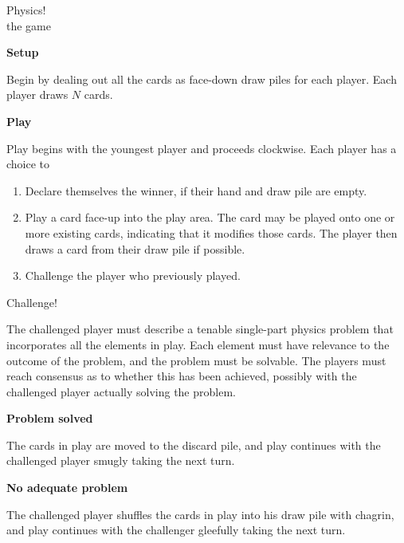 \documentclass[11pt]{article}
\newcommand\myssection[1]{\begin{center}\bf\small\noindent #1\end{center}}
\newcommand\myheader[1]{\begin{center}\small\sc #1\end{center}}
\begin{document}
\myheader{\Large\sc Physics! \footnotesize \\  the game}

\tiny

\myssection{Setup} Begin by dealing out all the cards as face-down
draw piles for each player.  Each player draws $N$ cards.

\myssection{Play} Play begins with the youngest player and proceeds
clockwise.  Each player has a choice to
\begin{enumerate}
\item Declare themselves the winner, if their hand and draw pile are
  empty.
\item Play a card face-up into the play area.  The card may be played
  onto one or more existing cards, indicating that it modifies those
  cards.  The player then draws a card from their draw pile if
  possible.
\item Challenge the player who previously played.
\end{enumerate}

\clearpage
\myheader{Challenge!} The challenged player must describe a tenable
single-part physics problem that incorporates all the elements in
play.  Each element must have relevance to the outcome of the problem,
and the problem must be solvable.  The players must reach consensus as
to whether this has been achieved, possibly with the challenged player
actually solving the problem.

\myssection{Problem solved} The cards in play are moved to the discard
pile, and play continues with the challenged player smugly taking the
next turn.

\myssection{No adequate problem} The challenged player shuffles the
cards in play into his draw pile with chagrin, and play continues with
the challenger gleefully taking the next turn.
\end{document}

